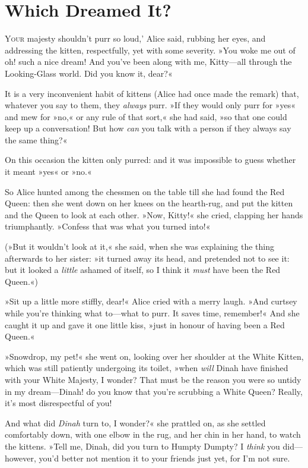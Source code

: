 \chapter{Which Dreamed It?}

\lettrine[lines=4,ante=`]{Y}{our} majesty shouldn't purr so loud,' Alice said, rubbing her eyes, and addressing the kitten, respectfully, yet with some severity. »You woke me out of oh! such a nice dream! And you've been along with me, Kitty—all through the Looking-Glass world. Did you know it, dear?«

It is a very inconvenient habit of kittens (Alice had once made the remark) that, whatever you say to them, they \textit{always} purr. »If they would only purr for »yes« and mew for »no,« or any rule of that sort,« she had said, »so that one could keep up a conversation! But how \textit{can} you talk with a person if they always say the same thing?«

On this occasion the kitten only purred: and it was impossible to guess whether it meant »yes« or »no.«

So Alice hunted among the chessmen on the table till she had found the Red Queen: then she went down on her knees on the hearth-rug, and put the kitten and the Queen to look at each other. »Now, Kitty!« she cried, clapping her hands triumphantly. »Confess that was what you turned into!«

(»But it wouldn't look at it,« she said, when she was explaining the thing afterwards to her sister: »it turned away its head, and pretended not to see it: but it looked a \textit{little} ashamed of itself, so I think it \textit{must} have been the Red Queen.«)

»Sit up a little more stiffly, dear!« Alice cried with a merry laugh. »And curtsey while you're thinking what to—what to purr. It saves time, remember!« And she caught it up and gave it one little kiss, »just in honour of having been a Red Queen.«

»Snowdrop, my pet!« she went on, looking over her shoulder at the White Kitten, which was still patiently undergoing its toilet, »when \textit{will} Dinah have finished with your White Majesty, I wonder? That must be the reason you were so untidy in my dream—Dinah! do you know that you're scrubbing a White Queen? Really, it's most disrespectful of you!

And what did \textit{Dinah} turn to, I wonder?« she prattled on, as she settled comfortably down, with one elbow in the rug, and her chin in her hand, to watch the kittens. »Tell me, Dinah, did you turn to Humpty Dumpty? I \textit{think} you did—however, you'd better not mention it to your friends just yet, for I'm not sure.

